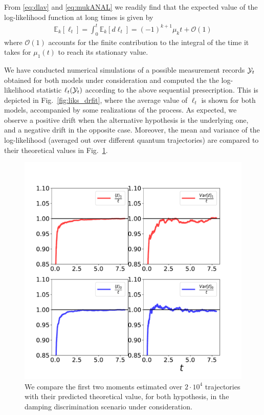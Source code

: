 From \eqref{eq:dlav} and \eqref{eq:mukANAL} we readily find that the expected value of the log-likelihood function at long times is given by
\begin{align}\label{eq:dint}
\mathbb{E}_k[\ell_{t}]  =\int_{0}^{t}\mathbb{E}_k[d\ell_{t}]= (-1)^{k+1} \mu_k t +\mathcal{O}(1)
\end{align}
where $\mathcal{O}(1)$ accounts for the finite contribution to the integral of the time it takes for $\mu_{1}(t)$ to reach its stationary value.

We have conducted numerical simulations of a possible measurement records $\mathcal{Y}_t$ obtained for both
models under consideration and  computed  the the log-likelihood statistic  $\ell_{t}(\mathcal{Y}_t)$ according to the above sequential presecription.
This is depicted in Fig.~\ref{fig:liks_drfit}, where the average value of $\ell_{t}$ is shown for both models, accompanied by some realizations of the process. As expected, we observe a positive drift when the alternative hypothesis is the underlying one, and a negative drift in the opposite case. Moreover, the mean and variance of the log-likelihood (averaged out over different quantum trajectories) are compared to their theoretical values in Fig.~\ref{fig:cmon_momentos}.

\begin{figure}[t!]
    \centering
    \includegraphics[width=1.\textwidth]{Figures/CMON/moments.pdf}
    \caption{We compare the first two moments estimated over $2 \cdot 10^{4}$ trajectories with their predicted theoretical value, for both hypothesis, in the damping discrimination scenario under consideration.}
    \label{fig:cmon_momentos}
\end{figure}

